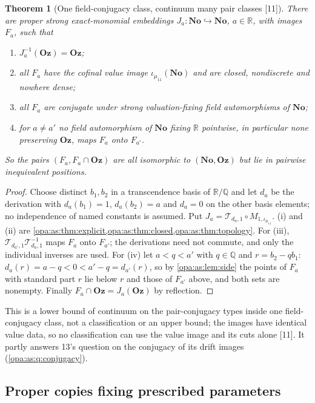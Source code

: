 \documentclass[11pt,oneside]{article}
\numberwithin{equation}{section}
\newtheorem{theorem}{Theorem}[section]
\theoremstyle{definition}
\theoremstyle{remark}
\newcommand{\No}{\mathbf{No}}
\newcommand{\Oz}{\mathbf{Oz}}
\newcommand{\R}{\mathbb R}
\newcommand{\Q}{\mathbb Q}
\newcommand{\src}[1]{\textup{\textsf{\small[#1]}}}
\begin{document}
\begin{theorem}[One field-conjugacy class, continuum many pair classes \src{11}]\label{opa:as:thm:continuum}
There are proper strong exact-monomial embeddings $J_a:\No\hookrightarrow\No$, $a\in\R$, with images $F_a$, such
that
\begin{enumerate}[label=\textup{(\roman*)},itemsep=1pt]
\item $J_a^{-1}(\Oz)=\Oz$;
\item all $F_a$ have the cofinal value image $\iota_{\mu_{11}}(\No)$ and are closed, nondiscrete and nowhere dense;
\item all $F_a$ are conjugate under strong valuation-fixing field automorphisms of $\No$;
\item for $a\ne a'$ no field automorphism of $\No$ fixing $\R$ pointwise, in particular none preserving $\Oz$,
maps $F_a$ onto $F_{a'}$.
\end{enumerate}
So the pairs $(F_a,F_a\cap\Oz)$ are all isomorphic to $(\No,\Oz)$ but lie in pairwise inequivalent positions.
\end{theorem}
\begin{proof}
Choose distinct $b_1,b_2$ in a transcendence basis of $\R/\Q$ and let $d_a$ be the derivation with $d_a(b_1)=1$,
$d_a(b_2)=a$ and $d_a=0$ on the other basis elements; no independence of named constants is assumed. Put
$J_a=\mathcal T_{d_a,1}\circ M_{1,\iota_{\mu_{11}}}$. (i) and (ii) are \cref{opa:as:thm:explicit,opa:as:thm:closed,opa:as:thm:topology}.
For (iii), $\mathcal T_{d_{a'},1}\mathcal T_{d_a,1}^{-1}$ maps $F_a$ onto $F_{a'}$; the derivations need not commute,
and only the individual inverses are used. For (iv) let $a<q<a'$ with $q\in\Q$ and $r=b_2-qb_1$: $d_a(r)=a-q<0<a'-q
=d_{a'}(r)$, so by \cref{opa:as:lem:side} the points of $F_a$ with standard part $r$ lie below $r$ and those of $F_{a'}$
above, and both sets are nonempty. Finally $F_a\cap\Oz=J_a(\Oz)$ by reflection.
\end{proof}

This is a lower bound of continuum on the pair-conjugacy types inside one field-conjugacy class, not a
classification or an upper bound; the images have identical value data, so no classification can use the value
image and its cuts alone \src{11}. It partly answers 13's question on the conjugacy of its drift images
(\cref{opa:as:q:conjugacy}).

\subsection{Proper copies fixing prescribed parameters}
\end{document}
